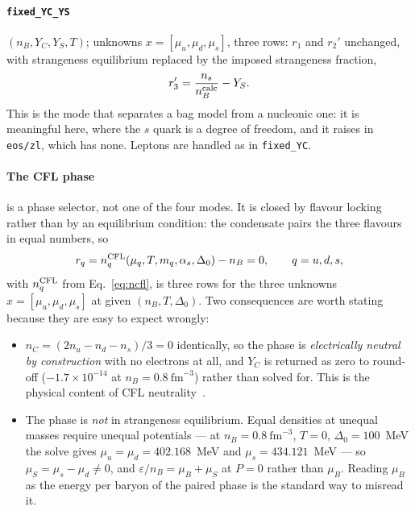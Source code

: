 \documentclass[aps,prc,onecolumn,superscriptaddress,nofootinbib,10pt]{revtex4-2}
\newcommand{\nB}{n_B}
\newcommand{\nC}{n_C}
\newcommand{\muB}{\mu_B}
\newcommand{\muS}{\mu_S}
\newcommand{\as}{\alpha_s}
\begin{document}
\paragraph{\texttt{fixed\_YC\_YS}} $(\nB, Y_C, Y_S, T)$; unknowns
$x = [\mu_u, \mu_d, \mu_s]$, three rows: $r_1$ and $r_2'$ unchanged, with
strangeness equilibrium replaced by the imposed strangeness fraction,
%
\begin{equation}
r_3' = \frac{n_s}{\nB^{\rm calc}} - Y_S .
\end{equation}
%
This is the mode that separates a bag model from a nucleonic one: it is
meaningful here, where the $s$ quark is a degree of freedom, and it raises in
\texttt{eos/zl}, which has none. Leptons are handled as in
\texttt{fixed\_YC}.

\paragraph{The CFL phase} is a phase selector, not one of the four modes. It
is closed by flavour locking rather than by an equilibrium condition: the
condensate pairs the three flavours in equal numbers, so
%
\begin{equation}
r_q = n_q^{\rm CFL}(\mu_q, T, m_q, \as, \Delta_0) - \nB = 0 , \qquad q = u, d, s ,
\label{eq:res_cfl}
\end{equation}
%
with $n_q^{\rm CFL}$ from Eq.~\eqref{eq:ncfl}, is three rows for the three
unknowns $x = [\mu_u, \mu_d, \mu_s]$ at given $(\nB, T, \Delta_0)$. Two
consequences are worth stating because they are easy to expect wrongly:

\begin{itemize}
\item $\nC = (2 n_u - n_d - n_s)/3 = 0$ identically, so the phase is
      \emph{electrically neutral by construction} with no electrons at all,
      and $Y_C$ is returned as zero to round-off ($-1.7\times10^{-14}$ at
      $\nB = 0.8\ \mathrm{fm}^{-3}$) rather than solved for. This is the
      physical content of CFL neutrality~\cite{AlfordRajagopalWilczek1999}.
\item The phase is \emph{not} in strangeness equilibrium. Equal densities at
      unequal masses require unequal potentials --- at $\nB = 0.8\
      \mathrm{fm}^{-3}$, $T = 0$, $\Delta_0 = 100$~MeV the solve gives
      $\mu_u = \mu_d = 402.168$~MeV and $\mu_s = 434.121$~MeV --- so
      $\muS = \mu_s - \mu_d \neq 0$, and $\varepsilon/\nB = \muB + \muS$ at
      $P = 0$ rather than $\muB$. Reading $\muB$ as the energy per baryon of
      the paired phase is the standard way to misread it.
\end{itemize}
\end{document}
